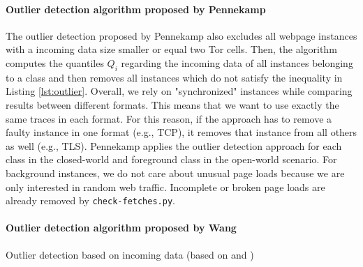 \paragraph{Outlier detection algorithm proposed by Pennekamp \cite{Pennekamp2014}}
\label{par:pennekamp_outlier}

The outlier detection proposed by Pennekamp \cite{Pennekamp2014} also excludes all webpage instances with a incoming data size smaller or equal
two Tor cells. Then, the algorithm computes the quantiles $Q_i$ regarding the incoming data of all instances belonging to a class and then removes all instances which do not satisfy the inequality in Listing \ref{lst:outlier}. Overall, we rely on "synchronized" instances while comparing results between different formats. This means that we want to use exactly the same traces in each format. For this reason, if the approach has to remove a faulty instance in one format (e.g., TCP), it removes that instance from all others as well (e.g., TLS). Pennekamp applies the outlier detection approach for each class in the closed-world and foreground class in the open-world scenario. For background instances, we do not care about unusual page loads because we are only interested in random web traffic. Incomplete or broken page loads are already removed by \texttt{check-fetches.py}.

\paragraph{Outlier detection algorithm proposed by Wang \cite{Wang2014}}
\label{par:wang_outlier}


\begin{listing}[t]
\caption{Outlier detection based on incoming data (based on \cite{Landa2013} and \cite{Pennekamp2014})}
\hrulefill\\[3mm]
\vspace{3mm}
\label{lst:outlier}
\end{listing}


